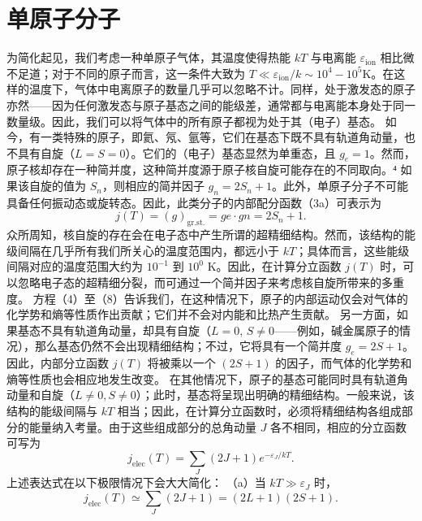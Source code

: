 \section{单原子分子}\label{ux5355ux539fux5b50ux5206ux5b50}
为简化起见，我们考虑一种单原子气体，其温度使得热能 \(kT\) 与电离能 \(\varepsilon_{\mathrm{ion}}\) 相比微不足道；对于不同的原子而言，这一条件大致为 \(T \ll \varepsilon_{\mathrm{ion}} / k \sim 10^{4}-10^{5} \mathrm{K}\)。在这样的温度下，气体中电离原子的数量几乎可以忽略不计。同样，处于激发态的原子亦然——因为任何激发态与原子基态之间的能级差，通常都与电离能本身处于同一数量级。因此，我们可以将气体中的所有原子都视为处于其（电子）基态。
如今，有一类特殊的原子，即氦、氖、氩等，它们在基态下既不具有轨道角动量，也不具有自旋（\(L = S = 0\)）。它们的（电子）基态显然为单重态，且 \(g_e = 1\)。然而，原子核却存在一种简并度，这种简并度源于原子核自旋可能存在的不同取向。⁴ 如果该自旋的值为 \(S_n\)，则相应的简并因子 \(g_n = 2S_n + 1\)。此外，单原子分子不可能具备任何振动态或旋转态。因此，此类分子的内部配分函数（3a）可表示为
\begin{equation}\tag{6.5.12}\label{eq:6.5.12}
j ( T ) = ( g ) _ { \mathrm { g r . s t . } } = g e \cdot g n = 2 S _ { n } + 1 .
\end{equation}
众所周知，核自旋的存在会在电子态中产生所谓的超精细结构。然而，该结构的能级间隔在几乎所有我们所关心的温度范围内，都远小于 \(kT\)；具体而言，这些能级间隔对应的温度范围大约为 \(10^{-1}\) 到 \(10^{0}\) K。因此，在计算分立函数 \(j(T)\) 时，可以忽略电子态的超精细分裂，而可通过一个简并因子来考虑核自旋所带来的多重度。
方程（4）至（8）告诉我们，在这种情况下，原子的内部运动仅会对气体的化学势和熵等性质作出贡献；它们并不会对内能和比热产生贡献。
另一方面，如果基态不具有轨道角动量，却具有自旋（\(L=0\), \(S\neq0\)——例如，碱金属原子的情况），那么基态仍然不会出现精细结构；不过，它将具有一个简并度 \(g_{e}=2S+1\)。因此，内部分立函数 \(j(T)\) 将被乘以一个 \((2S+1)\) 的因子，而气体的化学势和熵等性质也会相应地发生改变。
在其他情况下，原子的基态可能同时具有轨道角动量和自旋（\(L \neq 0, S \neq 0\)）；此时，基态将呈现出明确的精细结构。一般来说，该结构的能级间隔与 \(kT\) 相当；因此，在计算分立函数时，必须将精细结构各组成部分的能量纳入考量。由于这些组成部分的总角动量 \(J\) 各不相同，相应的分立函数可写为
\begin{equation}\tag{6.5.13}\label{eq:6.5.13}
j _ { \mathrm { e l e c } } ( T ) = \sum _ { J } ( 2 J + 1 ) e ^{- \varepsilon _ { J} / k T } .
\end{equation}
上述表达式在以下极限情况下会大大简化：
（a）当 \(kT \gg \varepsilon_J\) 时，
\begin{equation}\tag{6.5.14}\label{eq:6.5.14}
j _ { \mathrm { e l e c } } ( T ) \simeq \sum _ { J } ( 2 J + 1 ) = ( 2 L + 1 ) ( 2 S + 1 ) .
\end{equation}
